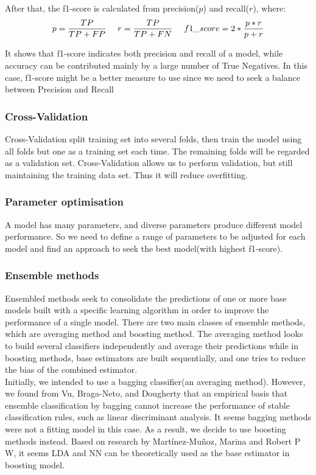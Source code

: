 \documentclass{article}
\begin{document}
After that, the f1-score is calculated from precision(\( p\)) and recall(\(r\)), where:
\begin{equation}
p = \frac{TP}{TP+FP}\ \ \ \
r = \frac{TP}{TP+FN} \ \ \ \
f1\_score = 2*\frac{p*r}{p+r}\\
\end{equation}

It shows that f1-score indicates both precision and recall of a model, while accuracy can be contributed mainly by a large number of True Negatives. In this case, f1-score might be a better measure to use since we need to seek a balance between Precision and Recall\cite{1}

\subsubsection{Cross-Validation}
Cross-Validation split training set into several folds, then train the model using all folds but one as a training set each time. The remaining folds will be regarded as a validation set. Cross-Validation allows us to perform validation, but still maintaining the training data set. Thus it will reduce overfitting.

\subsubsection{Parameter optimisation}
A model has many parameters, and diverse parameters produce different model performance. So we need to define a range of parameters to be adjusted for each model and find an approach to seek the best model(with highest f1-score).
 
\subsubsection{Ensemble methods}
Ensembled methods seek to consolidate the predictions of one or more base models built with a specific learning algorithm in order to improve the performance of a single model.
There are two main classes of ensemble methods, which are averaging method and boosting method. The averaging method looks to build several classifiers independently and average their predictions while in boosting methods, base estimators are built sequentially, and one tries to reduce the bias of the combined estimator.\\
Initially, we intended to use a bagging classifier(an averaging method). However, we found from Vu, Braga-Neto, and Dougherty \cite{4}that an empirical basis that ensemble classification by bagging cannot increase the performance of stable classification rules, such as linear discriminant analysis. It seems bagging methods were not a fitting model in this case. As a result, we decide to use boosting methods instead. Based on research by Martínez-Muñoz\cite{3}, Marina and Robert P W\cite{2}, it seems LDA and NN can be theoretically used as the base estimator in boosting model.
\end{document}
